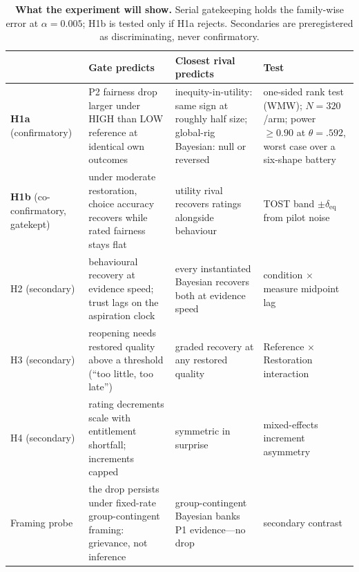 \documentclass[11pt]{article}
\newcommand{\1}{\mathbf{1}}
\begin{document}
\begin{table}[t]
\small
\caption{\textbf{What the experiment will show.} Serial gatekeeping holds the family-wise error at $\alpha=0.005$; H1b is tested only if H1a rejects. Secondaries are preregistered as discriminating, never confirmatory.}
\label{tab:pred}
\begin{tabular}{@{}p{}p{}p{}p{}@{}}
\hline
 & Gate predicts & Closest rival predicts & Test \\
\hline
\textbf{H1a} (confirmatory) & P2 fairness drop larger under HIGH than LOW reference at identical own outcomes & inequity-in-utility: same sign at roughly half size; global-rig Bayesian: null or reversed & one-sided rank test (WMW); $N{=}320$/arm; power $\ge0.90$ at $\theta{=}.592$, worst case over a six-shape battery \\
\textbf{H1b} (co-confirmatory, gatekept) & under moderate restoration, choice accuracy recovers while rated fairness stays flat & utility rival recovers ratings alongside behaviour & TOST band $\pm\delta_{\mathrm{eq}}$ from pilot noise \\
H2 (secondary) & behavioural recovery at evidence speed; trust lags on the aspiration clock & every instantiated Bayesian recovers both at evidence speed & condition $\times$ measure midpoint lag \\
H3 (secondary) & reopening needs restored quality above a threshold (``too little, too late'') & graded recovery at any restored quality & Reference $\times$ Restoration interaction \\
H4 (secondary) & rating decrements scale with entitlement shortfall; increments capped & symmetric in surprise & mixed-effects increment asymmetry \\
Framing probe & the drop persists under fixed-rate group-contingent framing: grievance, not inference & group-contingent Bayesian banks P1 evidence---no drop & secondary contrast \\
\hline
\end{tabular}
\end{table}
\end{document}
